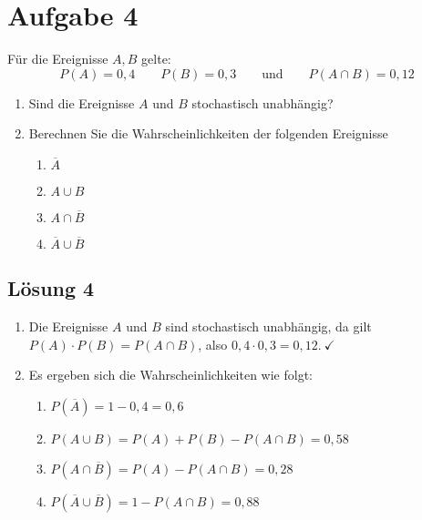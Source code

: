 \documentclass[main.tex]{subfiles}
\begin{document}
\section{Aufgabe 4}
Für die Ereignisse $A, B$ gelte:
$$
    P(A) = 0,4 \qquad P(B) = 0,3 \qquad \text{und} \qquad P(A\cap B) = 0,12
$$

\begin{enumerate}
    \item Sind die Ereignisse $A$ und $B$ stochastisch unabhängig?
    \item Berechnen Sie die Wahrscheinlichkeiten der folgenden Ereignisse
    \begin{enumerate}
        \item $\overline{A}$
        \item $A \cup B$
        \item $A \cap \overline{B}$
        \item $\overline{A} \cup \overline{B}$
    \end{enumerate}
\end{enumerate}

\subsection{Lösung 4}
\begin{enumerate}
    \item Die Ereignisse $A$ und $B$ sind stochastisch unabhängig, da gilt $P(A)\cdot P(B) = P(A\cap B)$, also $0,4\cdot 0,3 = 0,12. \ \checkmark$
    \item Es ergeben sich die Wahrscheinlichkeiten wie folgt:
    \begin{enumerate}
        \item $P(\overline{A}) = 1 - 0,4 = 0,6$
        \item $P(A \cup B) = P(A) + P(B) - P(A\cap B) = 0,58$
        \item $P(A \cap \overline{B}) = P(A) - P(A\cap B) = 0,28$
        \item $P(\overline{A} \cup \overline{B}) = 1 - P(A\cap B) = 0,88$
    \end{enumerate}
\end{enumerate}
\end{document}
